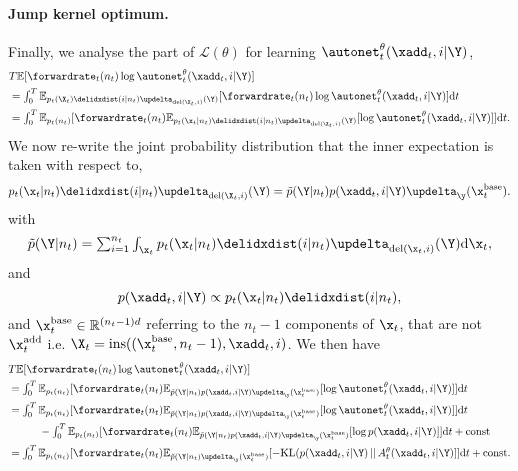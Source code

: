 \paragraph{Jump kernel optimum.} Finally, we analyse the part of
$\mathcal{L}(\theta)$ for learning $\autonet_t^\theta(\xadd_t, i | \Y)$,
\begin{align}
    &\textstyle T \mathbb{E} [ \forwardrate_t(n_t) \log \autonet_t^\theta(\xadd_t, i | \Y) ]\\
    &\textstyle = \int_{0}^T \mathbb{E}_{p_t(\X_t) \delidxdist(i | n_t) \updelta_{\text{del}(\X_t, i)}(\Y)} [ \forwardrate_t(n_t) \log \autonet_t^\theta(\xadd_t, i | \Y) ] \rmd t\\
    &\textstyle = \int_{0}^T \mathbb{E}_{p_t(n_t)} [ \forwardrate_t(n_t) \mathbb{E}_{p_t(\x_t | n_t) \delidxdist(i | n_t) \updelta_{\text{del}(\X_t, i)}(\Y)} [ \log \autonet_t^\theta(\xadd_t, i | \Y) ] ] \rmd t.
\end{align}
We now re-write the joint probability distribution that the inner expectation is taken with respect to,
\begin{equation}
    p_t(\x_t | n_t) \delidxdist(i | n_t) \updelta_{\text{del}(\X_t, i)}(\Y) = \tilde{p}(\Y | n_t) p(\xadd_t, i | \Y) \updelta_{\y}(\x_t^{\text{base}}) . 
\end{equation}
with 
\begin{equation}
  \textstyle 
    \tilde{p}(\Y | n_t) = \sum_{i=1}^{n_t} \int_{\x_t} p_t(\x_t | n_t) \delidxdist(i | n_t) \updelta_{\text{del}(\x_t, i)}(\Y) \rmd \x_t,
  \end{equation}
  and
\begin{equation}
    p(\xadd_t, i | \Y) \propto p_t(\x_t | n_t) \delidxdist(i | n_t) , 
\end{equation}
and $\x_t^{\text{base}} \in \mathbb{R}^{(n_t-1)d}$ referring to the $n_t - 1$ components of $\x_t$, that are not $\x_t^{\text{add}}$ i.e. $\X_t = \text{ins}((\x_t^{\text{base}}, n_t - 1), \xadd_t, i)$.
We then have
\begin{align}
    &\textstyle T \mathbb{E} [ \forwardrate_t(n_t) \log \autonet_t^\theta(\xadd_t, i | \Y) ]\\
    &\textstyle = \int_{0}^T \mathbb{E}_{p_t(n_t)} [ \forwardrate_t(n_t) \mathbb{E}_{\tilde{p}(\Y | n_t) p(\xadd_t, i | \Y) \updelta_{\y}(\x_t^{\text{base}})} [ \log \autonet_t^\theta(\xadd_t, i | \Y) ] ] \rmd t\\
    &\textstyle = \int_{0}^T \mathbb{E}_{p_t(n_t)} [ \forwardrate_t(n_t) \mathbb{E}_{\tilde{p}(\Y | n_t) p(\xadd_t, i | \Y) \updelta_{\y}(\x_t^{\text{base}})} [ \log \autonet_t^\theta(\xadd_t, i | \Y) ] ] \rmd t \\
    &\textstyle  \hspace{1cm} - \int_{0}^T \mathbb{E}_{p_t(n_t)} [ \forwardrate_t(n_t) \mathbb{E}_{\tilde{p}(\Y | n_t) p(\xadd_t, i | \Y) \updelta_{\y}(\x_t^{\text{base}})} [ \log p(\xadd_t, i | \Y) ] ] \rmd t + \text{const}\\
    &\textstyle = \int_{0}^T \mathbb{E}_{p_t(n_t)} [ \forwardrate_t(n_t) \mathbb{E}_{\tilde{p}(\Y | n_t) \updelta_{\y}(\x_t^{\text{base}}) } [ - \text{KL}(p(\xadd_t, i | \Y) \, || \, A_t^\theta(\xadd_t, i | \Y) ] ] \rmd t + \text{const} .
\end{align}
